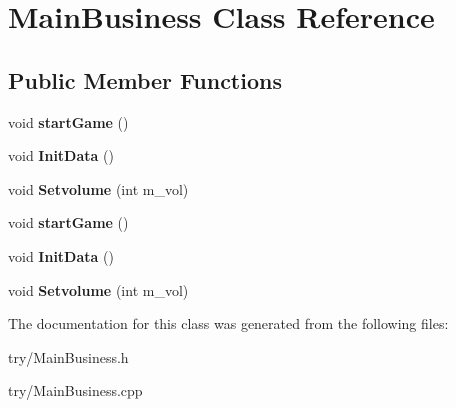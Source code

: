 \hypertarget{classMainBusiness}{}\section{Main\+Business Class Reference}
\label{classMainBusiness}
\subsection*{Public Member Functions}
\begin{DoxyCompactItemize}
\item 
\mbox{\label{classMainBusiness_ad1284ae730761b580628722fec540a82}} 
void {\bfseries start\+Game} ()
\item 
\mbox{\label{classMainBusiness_a3b799e2560d567f675fb806af7973271}} 
void {\bfseries Init\+Data} ()
\item 
\mbox{\label{classMainBusiness_a365c54d99ed16e40ea516f00a8e7cd55}} 
void {\bfseries Setvolume} (int m\+\_\+vol)
\item 
\mbox{\label{classMainBusiness_ad1284ae730761b580628722fec540a82}} 
void {\bfseries start\+Game} ()
\item 
\mbox{\label{classMainBusiness_a3b799e2560d567f675fb806af7973271}} 
void {\bfseries Init\+Data} ()
\item 
\mbox{\label{classMainBusiness_a365c54d99ed16e40ea516f00a8e7cd55}} 
void {\bfseries Setvolume} (int m\+\_\+vol)
\end{DoxyCompactItemize}


The documentation for this class was generated from the following files\+:\begin{DoxyCompactItemize}
\item 
try/Main\+Business.\+h\item 
try/Main\+Business.\+cpp\end{DoxyCompactItemize}
